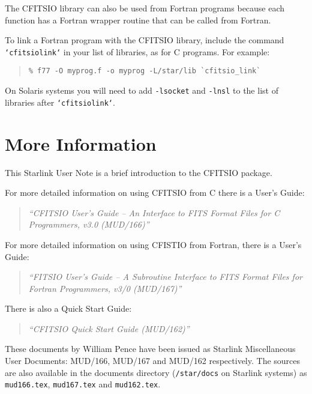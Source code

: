 \documentclass[twoside,11pt]{article}
\newcommand{\xlabel}[1]{}
\renewcommand{\_}{\texttt{\symbol{95}}}
\begin{document}
The CFITSIO library can also be used from Fortran programs because each
function has a Fortran wrapper routine that can be called from Fortran.

To link a Fortran program with the CFITSIO library, include the command
\texttt{`cfitsio\_link`} in your list of libraries, as for C programs.
For example:

\begin{quote}
\begin{verbatim}
% f77 -O myprog.f -o myprog -L/star/lib `cfitsio_link`
\end{verbatim}
\end{quote}

On Solaris systems you will need to add \texttt{-lsocket} and \texttt{-lnsl}
to the list of libraries after \texttt{`cfitsio\_link`}.

\section{\xlabel{more_information}More Information}
\label{more_information}

This Starlink User Note is a brief introduction to the CFITSIO package.

For more detailed information on using CFITSIO from C there is a User's 
Guide: 

\begin{quote}
\textit{``CFITSIO User's Guide -- An Interface to FITS Format Files for 
C Programmers, v3.0 (MUD/166)''}
\end{quote}

For more detailed information on using CFISTIO from Fortran, there is a 
User's Guide:

\begin{quote}
\textit{``FITSIO User's Guide -- A Subroutine Interface to FITS Format 
Files for Fortran Programmers, v3/0 (MUD/167)''}
\end{quote}

There is also a Quick Start Guide:

\begin{quote}
\textit{``CFITSIO Quick Start Guide (MUD/162)''}
\end{quote}

These documents by William Pence have been issued as Starlink
Miscellaneous User Documents:  MUD/166, MUD/167 and MUD/162 respectively.
The sources are also available in the documents directory
(\texttt{/star/docs} on Starlink systems) as \texttt{mud166.tex}, 
\texttt{mud167.tex} and \texttt{mud162.tex}.
\end{document}
